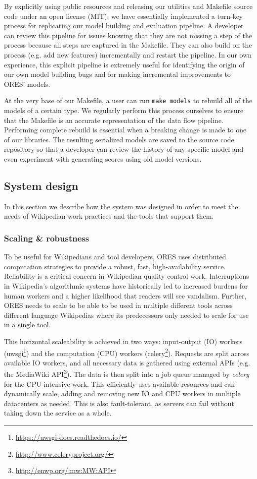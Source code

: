 By explicitly using public resources and releasing our utilities and Makefile source code under an open license (MIT), we have essentially implemented a turn-key process for replicating our model building and evaluation pipeline.  A developer can review this pipeline for issues knowing that they are not missing a step of the process because all steps are captured in the Makefile.  They can also build on the process (e.g. add new features) incrementally and restart the pipeline.  In our own experience, this explicit pipeline is extremely useful for identifying the origin of our own model building bugs and for making incremental improvements to ORES' models.

At the very base of our Makefile, a user can run \texttt{make models} to rebuild all of the models of a certain type.  We regularly perform this process ourselves to ensure that the Makefile is an accurate representation of the data flow pipeline.  Performing complete rebuild is essential when a breaking change is made to one of our libraries.  The resulting serialized models are saved to the source code repository so that a developer can review the history of any specific model and even experiment with generating scores using old model versions.

\subsection{System design}
In this section we describe how the system was designed in order to meet the needs of Wikipedian work practices and the tools that support them.

\subsubsection{Scaling \& robustness}
To be useful for Wikipedians and tool developers, ORES uses distributed computation strategies to provide a robust, fast, high-availability service.  Reliability is a critical concern in Wikipedian quality control work.  Interruptions in Wikipedia's algorithmic systems have historically led to increased burdens for human workers and a higher likelihood that readers will see vandalism\cite{geiger2013levee}.  Further, ORES needs to scale to be able to be used in multiple different tools across different language Wikipedias where its predecessors only needed to scale for use in a single tool.

This horizontal scaleability is achieved in two ways: input-output (IO) workers (uwsgi\footnote{\url{https://uwsgi-docs.readthedocs.io/}}) and the computation (CPU) workers (celery\footnote{\url{http://www.celeryproject.org/}}).  Requests are split across available IO workers, and all necessary data is gathered using external APIs (e.g. the MediaWiki API\footnote{\url{http://enwp.org/:mw:MW:API}}).  The data is then split into a job queue managed by \emph{celery} for the CPU-intensive work.  This efficiently uses available resources and can dynamically scale, adding and removing new IO and CPU workers in multiple datacenters as needed.  This is also fault-tolerant, as servers can fail without taking down the service as a whole.

